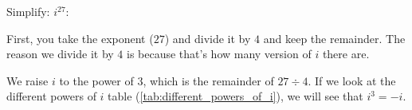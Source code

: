 \begin{example}
  \label{exm:different_powers_of_i}

  Simplify: $i^{27}$:

  First, you take the exponent ($27$) and divide it by $4$ and keep the
  remainder. The reason we divide it by $4$ is because that's how many version
  of $i$ there are.


  We raise $i$ to the power of $3$, which is the remainder of $27 \div 4$.
  If we look at the different powers of $i$ table
  (\ref{tab:different_powers_of_i}), we will see that $i^{3} = -i$.
\end{example}


\newpage
